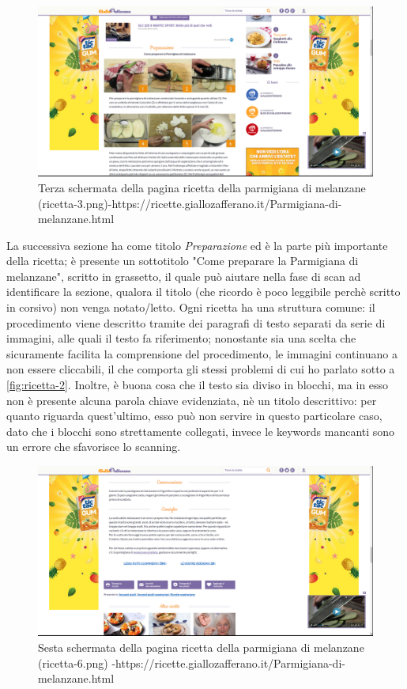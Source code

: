 \begin{figure}[h!]
	\centerline{
	\includegraphics[scale=0.2]{images/ricetta-3.png}}
	\caption{Terza schermata della pagina ricetta della parmigiana di melanzane (ricetta-3.png)-\newline https://ricette.giallozafferano.it/Parmigiana-di-melanzane.html}
	\label{fig:ricetta-3}
\end{figure}

La successiva sezione ha come titolo \textit{Preparazione} ed è la parte più importante della ricetta; è presente un sottotitolo "Come preparare la Parmigiana di melanzane", scritto in grassetto, il quale può aiutare nella fase di scan ad identificare la sezione, qualora il titolo (che ricordo è poco leggibile perchè scritto in corsivo) non venga notato/letto. 
Ogni ricetta ha una struttura comune: il procedimento viene descritto tramite dei paragrafi di testo separati da serie di immagini, alle quali il testo fa riferimento; nonostante sia una scelta che sicuramente facilita la comprensione del procedimento, le immagini continuano a non essere cliccabili, il che comporta gli stessi problemi di cui ho parlato sotto a \ref{fig:ricetta-2}. Inoltre, è buona cosa che il testo sia diviso in blocchi, ma in esso non è presente alcuna parola chiave evidenziata, nè un titolo descrittivo: per quanto riguarda quest'ultimo, esso può non servire in questo particolare caso, dato che i blocchi sono strettamente collegati, invece le keywords mancanti sono un errore che sfavorisce lo scanning.

\clearpage

\begin{figure}[h!]
	\centerline{
	\includegraphics[scale=0.2]{images/ricetta-6.png}}
	\caption{Sesta schermata della pagina ricetta della parmigiana di melanzane (ricetta-6.png) -\newline https://ricette.giallozafferano.it/Parmigiana-di-melanzane.html}
	\label{fig:ricetta-6}
\end{figure}

